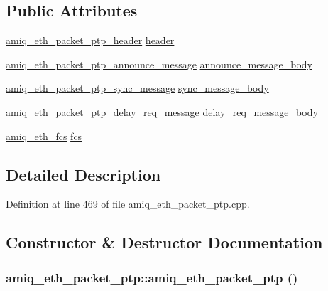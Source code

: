 \subsection*{Public Attributes}
\begin{DoxyCompactItemize}
\item 
\hyperlink{classamiq__eth__packet__ptp__header}{amiq\_\-eth\_\-packet\_\-ptp\_\-header} \hyperlink{classamiq__eth__packet__ptp_a09df382a165bd23e508f402ff0833c36}{header}
\item 
\hyperlink{classamiq__eth__packet__ptp__announce__message}{amiq\_\-eth\_\-packet\_\-ptp\_\-announce\_\-message} \hyperlink{classamiq__eth__packet__ptp_a6d3636995bf83da8721a245b27495e24}{announce\_\-message\_\-body}
\item 
\hyperlink{classamiq__eth__packet__ptp__sync__message}{amiq\_\-eth\_\-packet\_\-ptp\_\-sync\_\-message} \hyperlink{classamiq__eth__packet__ptp_ad28ea57af5d6111b1724fb14e995d30c}{sync\_\-message\_\-body}
\item 
\hyperlink{classamiq__eth__packet__ptp__delay__req__message}{amiq\_\-eth\_\-packet\_\-ptp\_\-delay\_\-req\_\-message} \hyperlink{classamiq__eth__packet__ptp_ad1117b52c9080df91e256d2649281547}{delay\_\-req\_\-message\_\-body}
\item 
\hyperlink{amiq__eth__types_8cpp_adb511dc715b55539c6abdad1de981a9f}{amiq\_\-eth\_\-fcs} \hyperlink{classamiq__eth__packet__ptp_a05a43b6fa83d4473878a59b44b8be088}{fcs}
\end{DoxyCompactItemize}


\subsection{Detailed Description}


Definition at line 469 of file amiq\_\-eth\_\-packet\_\-ptp.cpp.

\subsection{Constructor \& Destructor Documentation}
\hypertarget{classamiq__eth__packet__ptp_a20167ddce08cead24360e27ac9e1e570}{
\subsubsection[{amiq\_\-eth\_\-packet\_\-ptp}]{\setlength{\rightskip}{0pt plus 5cm}amiq\_\-eth\_\-packet\_\-ptp::amiq\_\-eth\_\-packet\_\-ptp ()}}
\label{classamiq__eth__packet__ptp_a20167ddce08cead24360e27ac9e1e570}


